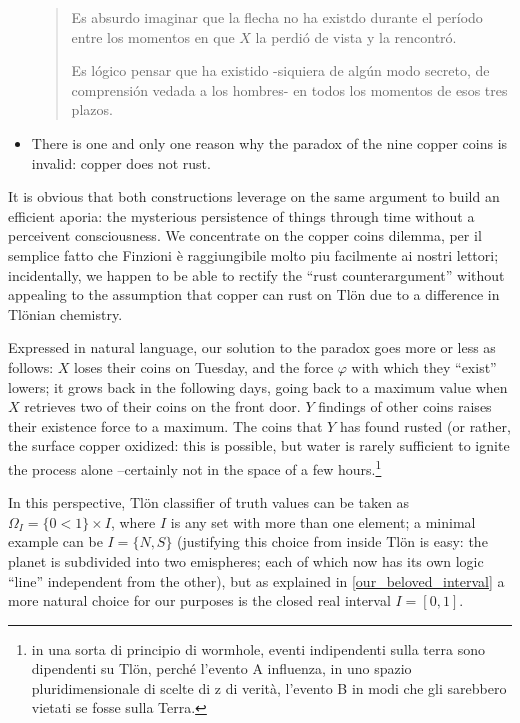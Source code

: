 \begin{example}
\begin{itemize}
\begin{quote}
						Es absurdo imaginar que la flecha no ha existdo durante el
						período entre los momentos en que $X$ la perdió de vista y la rencontró.

						Es lógico pensar que ha existido -siquiera de algún modo secreto, de comprensión vedada a los hombres- en todos los momentos de esos tres plazos.
		      \end{quote}
		\item There is one and only one reason why the paradox of the nine copper coins is invalid: copper does not rust.
	\end{itemize}
	It is obvious that both constructions leverage on the same argument to build an efficient aporia: the mysterious persistence of things through time without a perceivent consciousness. We concentrate on the copper coins dilemma, per il semplice fatto che Finzioni è raggiungibile molto piu facilmente ai nostri lettori; incidentally, we happen to be able to rectify the ``rust counterargument'' without appealing to the assumption that copper can rust on Tl\"on due to a difference in Tl\"onian chemistry.

	Expressed in natural language, our solution to the paradox goes more or less as follows: $X$ loses their coins on Tuesday, and the force $\varphi$ with which they ``exist'' lowers; it grows back in the following days, going back to a maximum value when $X$ retrieves two of their coins on the front door. $Y$ findings of other coins raises their existence force to a maximum. The coins that $Y$ has found rusted (or rather, the surface copper oxidized: this is possible, but water is rarely sufficient to ignite the process alone --certainly not in the space of a few hours.\footnote{in una sorta di principio di wormhole, eventi indipendenti sulla terra sono dipendenti su Tlön, perché l'evento A influenza, in uno spazio pluridimensionale di scelte di z di verità, l'evento B in modi che gli sarebbero vietati se fosse sulla Terra.}
	\begin{remark}\label{our_beloved_interval}
		In this perspective, Tl\"on classifier of truth values can be taken as $\Omega_I = \{0<1\}\times I$, where $I$ is any set with more than one element; a minimal example can be $I=\{N,S\}$ (justifying this choice from inside Tl\"on is easy: the planet is subdivided into two emispheres; each of which now has its own logic ``line'' independent from the other), but as explained in \autoref{our_beloved_interval} a more natural choice for our purposes is the closed real interval $I=[0,1]$.


\end{remark}
\end{example}
